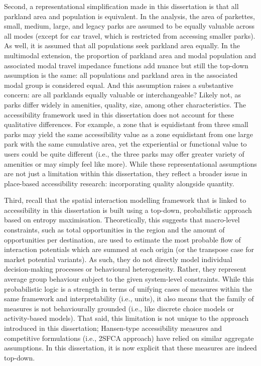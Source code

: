 \documentclass[
11pt, %
oneside, %
english, %
singlespacing, %
]{macthesis} %
\begin{document}
Second, a representational simplification made in this dissertation is that all parkland area and population is equivalent. In the analysis, the area of parkettes, small, medium, large, and legacy parks are assumed to be equally valuable across all modes (except for car travel, which is restricted from accessing smaller parks). As well, it is assumed that all populations seek parkland area equally. In the multimodal extension, the proportion of parkland area and modal population and associated modal travel impedance functions add nuance but still the top-down assumption is the same: all populations and parkland area in the associated modal group is considered equal. And this assumption raises a substantive concern: are all parklands equally valuable or interchangeable? Likely not, as parks differ widely in amenities, quality, size, among other characteristics. The accessibility framework used in this dissertation does not account for these qualitative differences. For example, a zone that is equidistant from three small parks may yield the same accessibility value as a zone equidistant from one large park with the same cumulative area, yet the experiential or functional value to users could be quite different (i.e., the three parks may offer greater variety of amenities or may simply feel like more). While these representational assumptions are not just a limitation within this dissertation, they reflect a broader issue in place-based accessibility research: incorporating quality alongside quantity.

Third, recall that the spatial interaction modelling framework that is linked to accessibility in this dissertation is built using a top-down, probabilistic approach based on entropy maximisation. Theoretically, this suggests that macro-level constraints, such as total opportunities in the region and the amount of opportunities per destination, are used to estimate the most probable flow of interaction potentials which are summed at each origin (or the transpose case for market potential variants). As such, they do not directly model individual decision-making processes or behavioural heterogeneity. Rather, they represent average group behaviour subject to the given system-level constraints. While this probabilistic logic is a strength in terms of unifying cases of measures within the same framework and interpretability (i.e., units), it also means that the family of measures is not behaviourally grounded (i.e., like discrete choice models or activity-based models). That said, this limitation is not unique to the approach introduced in this dissertation; Hansen-type accessibility measures and competitive formulations (i.e., 2SFCA approach) have relied on similar aggregate assumptions. In this dissertation, it is now explicit that these measures are indeed top-down.
\end{document}
